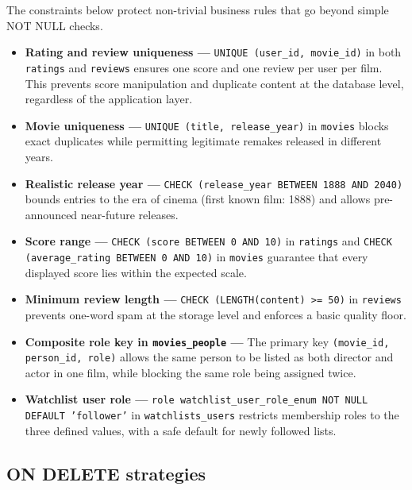 \documentclass[11pt, a4paper]{article}
\begin{document}
The constraints below protect non-trivial business rules that go beyond
simple NOT NULL checks.

\begin{itemize}
    \item \textbf{Rating and review uniqueness ---}
    \texttt{UNIQUE (user\_id, movie\_id)} in both \texttt{ratings} and
    \texttt{reviews} ensures one score and one review per user per film.
    This prevents score manipulation and duplicate content at the database
    level, regardless of the application layer.

    \item \textbf{Movie uniqueness ---}
    \texttt{UNIQUE (title, release\_year)} in \texttt{movies} blocks exact
    duplicates while permitting legitimate remakes released in different
    years.

    \item \textbf{Realistic release year ---}
    \texttt{CHECK (release\_year BETWEEN 1888 AND 2040)} bounds entries to
    the era of cinema (first known film: 1888) and allows pre-announced
    near-future releases.

    \item \textbf{Score range ---}
    \texttt{CHECK (score BETWEEN 0 AND 10)} in \texttt{ratings} and
    \texttt{CHECK (average\_rating BETWEEN 0 AND 10)} in \texttt{movies}
    guarantee that every displayed score lies within the expected scale.

    \item \textbf{Minimum review length ---}
    \texttt{CHECK (LENGTH(content) >= 50)} in \texttt{reviews} prevents
    one-word spam at the storage level and enforces a basic quality floor.

    \item \textbf{Composite role key in \texttt{movies\_people} ---}
    The primary key \texttt{(movie\_id, person\_id, role)} allows the same
    person to be listed as both director and actor in one film, while
    blocking the same role being assigned twice.

    \item \textbf{Watchlist user role ---}
    \texttt{role watchlist\_user\_role\_enum NOT NULL DEFAULT 'follower'}
    in \texttt{watchlists\_users} restricts membership roles to the three
    defined values, with a safe default for newly followed lists.
\end{itemize}

\subsection{ON DELETE strategies}
\end{document}
